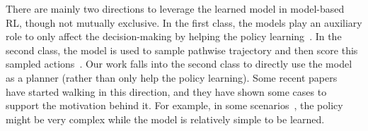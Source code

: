 \documentclass{article} %
\newcommand{\yue}[1]{ {#1}}
\newcommand{\revision}[1]{{#1}}
\begin{document}


\revision{There are mainly two directions to leverage the learned model in model-based RL, though not mutually exclusive. In the first class, the models   play an auxiliary role to only affect the decision-making by helping the policy learning~\citep{janner_when_2019,clavera_model-augmented_2019}. In the second class, the model is used to sample pathwise trajectory and then score this sampled actions~\citep{schrittwieser2020mastering}. Our work falls into the second class to directly use the model as a planner (rather than only help the policy learning).
Some recent papers~\citep{dong2020expressivity,hubert2021learning,pmlr-v162-hansen22a} have started walking in this direction, and they have shown some cases to support the motivation behind it. For example, in some scenarios~\citep{dong2020expressivity}, the policy might be very complex while the model is relatively simple to be learned.  } 
\end{document}
